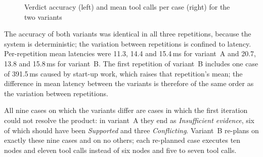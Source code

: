 \begin{figure}[H]
\centering
{}\hfill
{}
\caption{Verdict accuracy (left) and mean tool calls per case (right) for the two variants}
\label{fig:ab}
\end{figure}

The accuracy of both variants was identical in all three repetitions, because the system is
deterministic; the variation between repetitions is confined to latency. Per-repetition mean latencies
were 11.3, 14.4 and 15.4\,ms for variant~A and 20.7, 13.8 and 15.8\,ms for variant~B. The first
repetition of variant~B includes one case of 391.5\,ms caused by start-up work, which raises that
repetition's mean; the difference in mean latency between the variants is therefore of the same order
as the variation between repetitions.

All nine cases on which the variants differ are cases in which the first iteration could not resolve
the product: in variant~A they end as \emph{Insufficient evidence}, six of which should have been
\emph{Supported} and three \emph{Conflicting}. Variant~B re-plans on exactly these nine cases and on no
others; each re-planned case executes ten nodes and eleven tool calls instead of six nodes and five to
seven tool calls.

